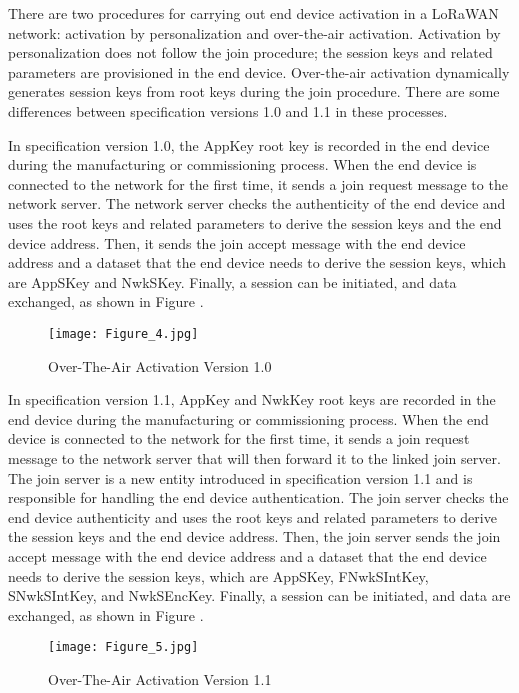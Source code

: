 \documentclass[manuscript,screen,review=false]{acmart}
\begin{document}
There are two procedures for carrying out end device activation in a LoRaWAN network: activation by personalization and over-the-air activation. Activation by personalization does not follow the join procedure; the session keys and related parameters are provisioned in the end device. Over-the-air activation dynamically generates session keys from root keys during the join procedure. There are some differences between specification versions 1.0 and 1.1 in these processes.

In specification version 1.0, the AppKey root key is recorded in the end device during the manufacturing or commissioning process. When the end device is connected to the network for the first time, it sends a join request message to the network server. The network server checks the authenticity of the end device and uses the root keys and related parameters to derive the session keys and the end device address. Then, it sends the join accept message with the end device address and a dataset that the end device needs to derive the session keys, which are AppSKey and NwkSKey. Finally, a session can be initiated, and data exchanged, as shown in Figure \cite{lorawan1.0}.

\begin{figure}[h]
  \centering
  \texttt{[image: Figure\_4.jpg]}
  \caption{Over-The-Air Activation Version 1.0}
\end{figure}

In specification version 1.1, AppKey and NwkKey root keys are recorded in the end device during the manufacturing or commissioning process. When the end device is connected to the network for the first time, it sends a join request message to the network server that will then forward it to the linked join server. The join server is a new entity introduced in specification version 1.1 and is responsible for handling the end device authentication. The join server checks the end device authenticity and uses the root keys and related parameters to derive the session keys and the end device address. Then, the join server sends the join accept message with the end device address and a dataset that the end device needs to derive the session keys, which are AppSKey, FNwkSIntKey, SNwkSIntKey, and NwkSEncKey. Finally, a session can be initiated, and data are exchanged, as shown in Figure \cite{lorawan1.1}.

\begin{figure}[h]
  \centering
  \texttt{[image: Figure\_5.jpg]}
  \caption{Over-The-Air Activation Version 1.1}
\end{figure}
\end{document}

